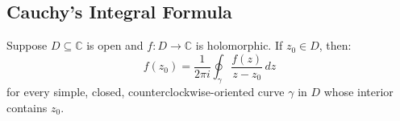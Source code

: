 \subsection{Cauchy's Integral Formula}
Suppose $D \subseteq \mathbb{C}$ is open and $f: D \rightarrow \mathbb{C}$ is holomorphic. If $z_0 \in D$, then:
\begin{equation*}
    f(z_0) = \frac{1}{2\pi i} \oint_\gamma \frac{f(z)}{z - z_0} \, dz
\end{equation*}
for every simple, closed, counterclockwise-oriented curve $\gamma$ in $D$ whose interior contains $z_0$.